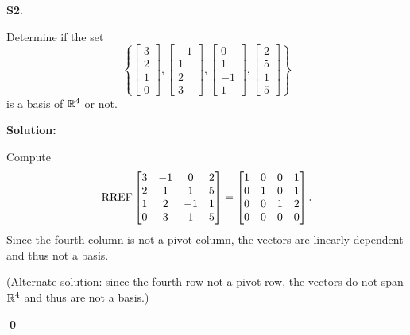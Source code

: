 \documentclass{article}
\newenvironment{problem}[1]
{
	\begin{flushleft}
	\textbf{#1}.
	\ignorespaces
}
{
	\end{flushleft}
}
\newenvironment{solution}
{
	\ignorespaces
	\textbf{Solution:}
}
{
	\ignorespacesafterend
	\begin{flushright}
	{\bfseries \qed}
	\end{flushright}
}
\begin{document}
\begin{problem}{S2}
Determine if the set \[ \left\{
 \begin{bmatrix} 3 \\ 2 \\ 1 \\ 0 \end{bmatrix} ,
 \begin{bmatrix} -1 \\ 1 \\ 2 \\ 3 \end{bmatrix} ,
 \begin{bmatrix} 0 \\ 1 \\ -1 \\ 1 \end{bmatrix} ,
 \begin{bmatrix} 2 \\ 5 \\ 1 \\ 5 \end{bmatrix} \right\} \]
is a basis of $\mathbb{R}^4$ or not.
\end{problem}
\begin{solution}
Compute
\[\operatorname{RREF} \begin{bmatrix} 3 & -1 & 0 & 2 \\ 2 & 1 & 1 & 5 \\ 1 & 2 & -1 & 1 \\ 0 & 3 & 1 & 5 \end{bmatrix} =
\begin{bmatrix} 1 & 0 & 0 & 1 \\ 0 & 1 & 0 & 1 \\ 0 & 0 & 1 & 2 \\ 0 & 0 & 0 & 0 \end{bmatrix}.\]
Since the fourth column is not a pivot column, the vectors are linearly
dependent and thus not a basis.

(Alternate solution:
since the fourth row not a pivot row, the vectors do not span
\(\mathbb{R}^4\) and thus are not a basis.)
\end{solution}
\end{document}
